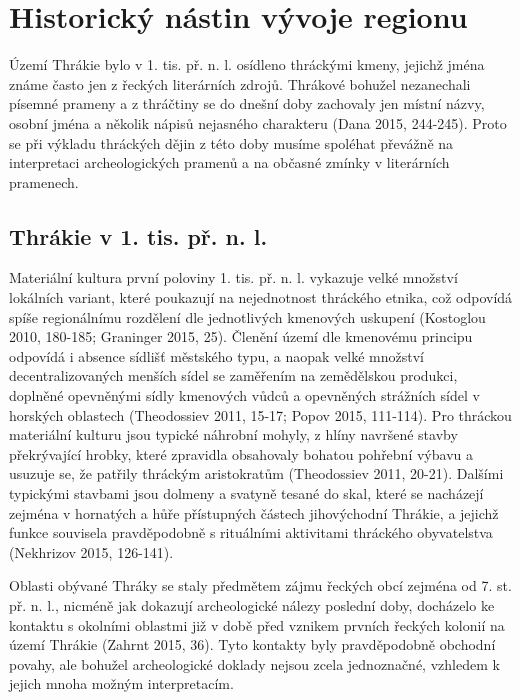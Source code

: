 \section[historický-nástin-vývoje-regionu]{Historický nástin vývoje regionu}

Území Thrákie bylo v 1. tis. př. n. l. osídleno thráckými kmeny, jejichž jména známe často jen z řeckých literárních zdrojů. Thrákové bohužel nezanechali písemné prameny a z thráčtiny se do dnešní doby zachovaly jen místní názvy, osobní jména a několik nápisů nejasného charakteru (Dana 2015, 244-245). Proto se při výkladu thráckých dějin z této doby musíme spoléhat převážně na interpretaci archeologických pramenů a na občasné zmínky v literárních pramenech.

\subsection[thrákie-v-1.-tis.-př.-n.-l.]{Thrákie v 1. tis. př. n. l.}

Materiální kultura první poloviny 1. tis. př. n. l. vykazuje velké množství lokálních variant, které poukazují na nejednotnost thráckého etnika, což odpovídá spíše regionálnímu rozdělení dle jednotlivých kmenových uskupení (Kostoglou 2010, 180-185; Graninger 2015, 25). Členění území dle kmenovému principu odpovídá i absence sídlišť městského typu, a naopak velké množství decentralizovaných menších sídel se zaměřením na zemědělskou produkci, doplněné opevněnými sídly kmenových vůdců a opevněných strážních sídel v horských oblastech (Theodossiev 2011, 15-17; Popov 2015, 111-114). Pro thráckou materiální kulturu jsou typické náhrobní mohyly, z hlíny navršené stavby překrývající hrobky, které zpravidla obsahovaly bohatou pohřební výbavu a usuzuje se, že patřily thráckým aristokratům (Theodossiev 2011, 20-21). Dalšími typickými stavbami jsou dolmeny a svatyně tesané do skal, které se nacházejí zejména v hornatých a hůře přístupných částech jihovýchodní Thrákie, a jejichž funkce souvisela pravděpodobně s rituálními aktivitami thráckého obyvatelstva (Nekhrizov 2015, 126-141).

Oblasti obývané Thráky se staly předmětem zájmu řeckých obcí zejména od 7. st. př. n. l., nicméně jak dokazují archeologické nálezy poslední doby, docházelo ke kontaktu s okolními oblastmi již v době před vznikem prvních řeckých kolonií na území Thrákie (Zahrnt 2015, 36). Tyto kontakty byly pravděpodobně obchodní povahy, ale bohužel archeologické doklady nejsou zcela jednoznačné, vzhledem k jejich mnoha možným interpretacím.


